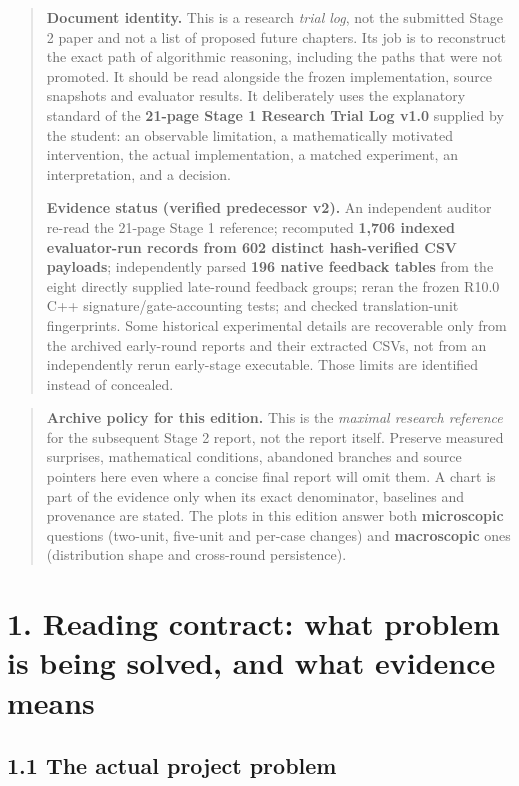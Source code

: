 \documentclass[a4paper,10pt]{article}
\theoremstyle{definition}
\theoremstyle{remark}
\newcounter{problem}
\begin{document}
\begin{quote}
\textbf{Document identity.} This is a research \emph{trial log}, not the submitted Stage 2 paper and not a list of proposed future chapters. Its job is to reconstruct the exact path of algorithmic reasoning, including the paths that were not promoted. It should be read alongside the frozen implementation, source snapshots and evaluator results. It deliberately uses the explanatory standard of the \textbf{21-page Stage 1 Research Trial Log v1.0} supplied by the student: an observable limitation, a mathematically motivated intervention, the actual implementation, a matched experiment, an interpretation, and a decision.

\textbf{Evidence status (verified predecessor v2).} An independent auditor re-read the 21-page Stage 1 reference; recomputed \textbf{1,706 indexed evaluator-run records from 602 distinct hash-verified CSV payloads}; independently parsed \textbf{196 native feedback tables} from the eight directly supplied late-round feedback groups; reran the frozen R10.0 C++ signature/gate-accounting tests; and checked translation-unit fingerprints. Some historical experimental details are recoverable only from the archived early-round reports and their extracted CSVs, not from an independently rerun early-stage executable. Those limits are identified instead of concealed.
\end{quote}

\begin{quote}
\textbf{Archive policy for this edition.} This is the \emph{maximal research reference} for the subsequent Stage 2 report, not the report itself. Preserve measured surprises, mathematical conditions, abandoned branches and source pointers here even where a concise final report will omit them. A chart is part of the evidence only when its exact denominator, baselines and provenance are stated. The plots in this edition answer both \textbf{microscopic} questions (two-unit, five-unit and per-case changes) and \textbf{macroscopic} ones (distribution shape and cross-round persistence).
\end{quote}

\section{1. Reading contract: what problem is being solved, and what evidence means}\label{reading-contract-what-problem-is-being-solved-and-what-evidence-means}

\subsection{1.1 The actual project problem}\label{the-actual-project-problem}
\end{document}
